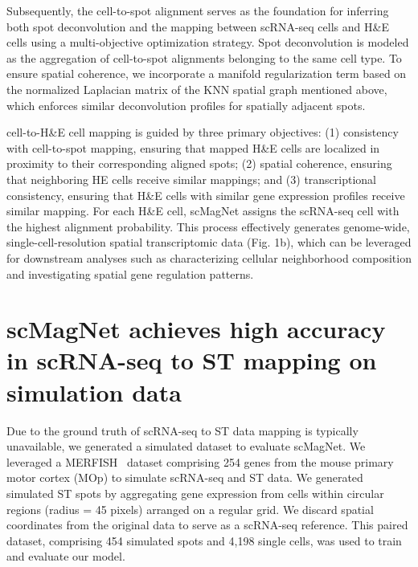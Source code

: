 \documentclass[10pt,a4paper]{article}
\begin{document}
Subsequently, the cell-to-spot alignment serves as the foundation for inferring both spot deconvolution and the mapping between scRNA-seq cells and H\&E cells using a multi-objective optimization strategy. Spot deconvolution is modeled as the aggregation of cell-to-spot alignments belonging to the same cell type. To ensure spatial coherence, we incorporate a manifold regularization term based on the normalized Laplacian matrix of the KNN spatial graph mentioned above, which enforces similar deconvolution profiles for spatially adjacent spots.

cell-to-H\&E cell mapping is guided by three primary objectives: (1) consistency with cell-to-spot mapping, ensuring that mapped H\&E cells are localized in proximity to their corresponding aligned spots; (2) spatial coherence, ensuring that neighboring HE cells receive similar mappings; and (3) transcriptional consistency, ensuring that H\&E cells with similar gene expression profiles receive similar mapping. For each H\&E cell, scMagNet assigns the scRNA-seq cell with the highest alignment probability. This process effectively generates genome-wide, single-cell-resolution spatial transcriptomic data (Fig. 1b), which can be leveraged for downstream analyses such as characterizing cellular neighborhood composition and investigating spatial gene regulation patterns.

\section{scMagNet achieves high accuracy in scRNA-seq to ST mapping on simulation data}

Due to the ground truth of scRNA-seq to ST data mapping is typically unavailable, we generated a simulated dataset to evaluate scMagNet. We leveraged a MERFISH~\cite{merfish} dataset comprising 254 genes from the mouse primary motor cortex (MOp) to simulate scRNA-seq and ST data. We generated simulated ST spots by aggregating gene expression from cells within circular regions (radius = 45 pixels) arranged on a regular grid. We discard spatial coordinates from the original data to serve as a scRNA-seq reference. This paired dataset, comprising 454 simulated spots and 4,198 single cells, was used to train and evaluate our model.
\end{document}
